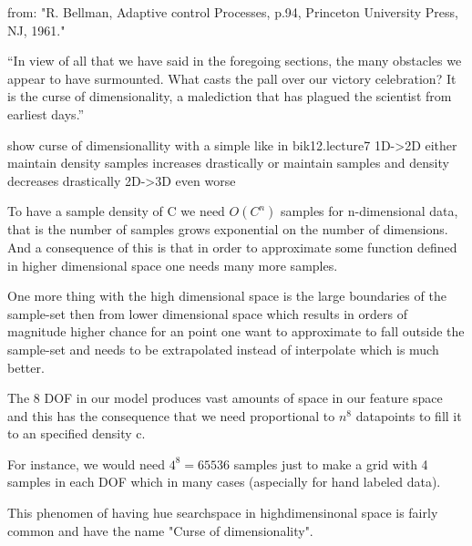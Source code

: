 from:
"R. Bellman, Adaptive control Processes, p.94, Princeton University Press, NJ,
1961."

“In view of all that we have said in the foregoing
sections, the many obstacles we appear to have
surmounted. What casts the pall over our victory
celebration? It is the curse of dimensionality, a
malediction that has plagued the scientist from
earliest days.”


show curse of dimensionallity with a simple like in bik12.lecture7
1D->2D
either maintain density samples increases drastically
or maintain samples and density decreases drastically
2D->3D
even worse

To have a sample density of C we need $O(C^n)$ samples for n-dimensional data,
that is the number of samples grows exponential on the number of dimensions.
And a consequence of this is that in order to approximate some
function defined in higher dimensional space one needs many more samples.

One more thing with the high dimensional space is the large boundaries 
of the sample-set then from lower dimensional space which results in orders of
magnitude higher chance for an point one want to approximate to fall outside
the sample-set and needs to be extrapolated instead of interpolate which is
much better.

%
%

%
%

%
%




The 8 DOF in our model produces vast amounts of space in our feature space and this has the consequence that we need proportional to $n^8$ datapoints to fill it to an specified density c.

For instance, we would need $4^8=65536$ samples just to make a grid with 4 samples in each DOF which in many cases (aspecially for hand labeled data). 

This phenomen of having hue searchspace in highdimensinonal space is fairly common and have the name "Curse of dimensionality".

